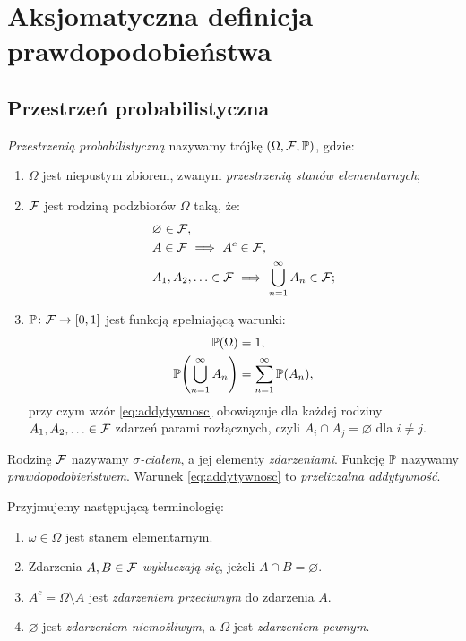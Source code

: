 \chapter{Aksjomatyczna definicja prawdopodobieństwa}
\label{chap:aksjomaty}

\section{Przestrzeń probabilistyczna}
\label{sec:przestrzen}

\begin{definicja}
\emph{Przestrzenią probabilistyczną} nazywamy trójkę
$(\Omega,\mathcal{F},\mathbb{P})$, gdzie:
\begin{enumerate}
  \item $\Omega$ jest niepustym zbiorem, zwanym \emph{przestrzenią
    stanów elementarnych};
  \item $\mathcal{F}$ jest rodziną podzbiorów $\Omega$ taką, że:
    \begin{align*}
      &\varnothing\in\mathcal{F},\\
      &A\in\mathcal{F}\ \Longrightarrow\ A^c\in\mathcal{F},\\
      &A_1,A_2,\ldots\in\mathcal{F}\ \Longrightarrow\
        \bigcup_{n=1}^{\infty}A_n\in\mathcal{F};
    \end{align*}
  \item $\mathbb{P}\colon\mathcal{F}\to[0,1]$ jest funkcją spełniającą warunki:
    \begin{align}
      \mathbb{P}(\Omega)&=1,\label{eq:normalizacja}\\
      \mathbb{P}\!\left(\bigcup_{n=1}^{\infty}A_n\right)
        &=\sum_{n=1}^{\infty}\mathbb{P}(A_n),
        \label{eq:addytywnosc}
    \end{align}
    przy czym wzór \eqref{eq:addytywnosc} obowiązuje dla każdej
    rodziny $A_1,A_2,\ldots\in\mathcal{F}$ zdarzeń parami rozłącznych, czyli
    $A_i\cap A_j=\varnothing$ dla $i\ne j$.
\end{enumerate}
Rodzinę $\mathcal{F}$ nazywamy \emph{$\sigma$-ciałem}, a jej elementy
\emph{zdarzeniami}. Funkcję $\mathbb{P}$ nazywamy \emph{prawdopodobieństwem}.
Warunek \eqref{eq:addytywnosc} to \emph{przeliczalna addytywność}.
\end{definicja}

\begin{uwaga}
Przyjmujemy następującą terminologię:
\begin{enumerate}
  \item $\omega\in\Omega$ jest stanem elementarnym.
  \item Zdarzenia $A,B\in\mathcal{F}$ \emph{wykluczają się}, jeżeli
    $A\cap B=\varnothing$.
  \item $A^c=\Omega\setminus A$ jest \emph{zdarzeniem przeciwnym}
    do zdarzenia $A$.
  \item $\varnothing$ jest \emph{zdarzeniem niemożliwym},
    a $\Omega$ jest \emph{zdarzeniem pewnym}.
\end{enumerate}
\end{uwaga}

